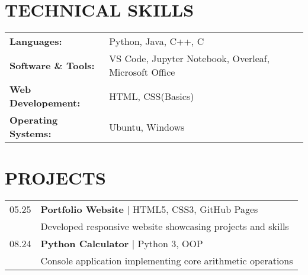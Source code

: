 \documentclass[12pt,a4paper]{moderncv}
\begin{document}
\vspace{0.5cm}





\section{\textbf{TECHNICAL SKILLS}}
\begin{tabular}{@{}ll@{}}
    \textbf{Languages:} & \hspace{0.5em} Python, Java, C++, C \\
     \textbf{Software \& Tools:} & \hspace{0.5em} VS Code, Jupyter Notebook, Overleaf, Microsoft Office \\
    \textbf{Web Developement:} & \hspace{0.5em} HTML, CSS(Basics) \\
    \textbf{Operating Systems:} & \hspace{0.5em} Ubuntu, Windows \\
\end{tabular}




\vspace{0.5cm}






\section{\textbf{PROJECTS}}
\begin{tabular}{r p{}}
  \textsc{05.25} & \hspace{1.5em} \textbf{Portfolio Website} | HTML5, CSS3, GitHub Pages \\
   & \hspace{1.5em} \footnotesize Developed responsive website showcasing projects and skills \\[0.2cm]
  \textsc{08.24} & \hspace{1.5em} \textbf{Python Calculator} | Python 3, OOP \\
   & \hspace{1.5em} \footnotesize Console application implementing core arithmetic operations \\
\end{tabular}


\vspace{0.5cm}
\end{document}
